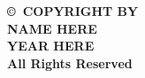 
\newpage
\thispagestyle{empty}

\begin{center}
{\bf \copyright~COPYRIGHT BY \\
NAME HERE \\
YEAR HERE \\
All Rights Reserved \\
}
\end{center}
